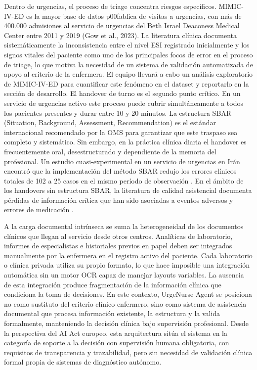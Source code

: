 Dentro de urgencias, el proceso de triage concentra riesgos específicos. MIMIC-IV-ED es la mayor base de datos p00fablica de visitas a urgencias, con más de 400.000 admisiones al servicio de urgencias del Beth Israel Deaconess Medical Center entre 2011 y 2019 (Gow et al., 2023). La literatura clínica documenta sistemáticamente la inconsistencia entre el nivel ESI registrado inicialmente y los signos vitales del paciente como uno de los principales focos de error en el proceso de triage, lo que motiva la necesidad de un sistema de validación automatizada de apoyo al criterio de la enfermera. El equipo llevará a cabo un análisis exploratorio de MIMIC-IV-ED para cuantificar este fenómeno en el dataset y reportarlo en la sección de desarrollo.
El handover de turno es el segundo punto crítico. En un servicio de urgencias activo este proceso puede cubrir simultáneamente a todos los pacientes presentes y durar entre 10 y 20 minutos. La estructura SBAR (Situation, Background, Assessment, Recommendation) es el estándar internacional recomendado por la OMS para garantizar que este traspaso sea completo y sistemático. Sin embargo, en la práctica clínica diaria el handover es frecuentemente oral, desestructurado y dependiente de la memoria del profesional. Un estudio cuasi-experimental en un servicio de urgencias en Irán encontró que la implementación del método SBAR redujo los errores clínicos totales de 102 a 25 casos en el mismo período de observación \parencite{chaharsoughi2025sbar}. En el ámbito de los handovers sin estructura SBAR, la literatura de calidad asistencial documenta pérdidas de información crítica que han sido asociadas a eventos adversos y errores de medicación \parencite{friesen2008handoffs}.

A la carga documental intrínseca se suma la heterogeneidad de los documentos clínicos que llegan al servicio desde otros centros. Analíticas de laboratorio, informes de especialistas e historiales previos en papel deben ser integrados manualmente por la enfermera en el registro activo del paciente. Cada laboratorio o clínica privada utiliza su propio formato, lo que hace imposible una integración automática sin un motor OCR capaz de manejar layouts variables. La ausencia de esta integración produce fragmentación de la información clínica que condiciona la toma de decisiones.
En este contexto, UrgeNurse Agent se posiciona no como sustituto del criterio clínico enfermero, sino como sistema de asistencia documental que procesa información existente, la estructura y la valida formalmente, manteniendo la decisión clínica bajo supervisión profesional. Desde la perspectiva del AI Act europeo, esta arquitectura sitúa el sistema en la categoría de soporte a la decisión con supervisión humana obligatoria, con requisitos de transparencia y trazabilidad, pero sin necesidad de validación clínica formal propia de sistemas de diagnóstico autónomo.


